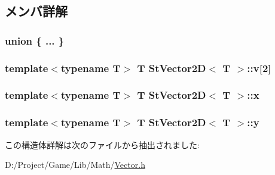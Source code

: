 \subsection{メンバ詳解}
\hypertarget{struct_st_vector2_d_ac356231747b1d0dceec316b255acb2a1}{}\subsubsection[{"@3}]{\setlength{\rightskip}{0pt plus 5cm}union \{ ... \} }\label{struct_st_vector2_d_ac356231747b1d0dceec316b255acb2a1}
\hypertarget{struct_st_vector2_d_ad3632da65fdf11cf3454dea5be131d6f}{}
\subsubsection[{v}]{\setlength{\rightskip}{0pt plus 5cm}template$<$typename T$>$ T {\bf St\+Vector2\+D}$<$ T $>$\+::v\mbox{[}2\mbox{]}}\label{struct_st_vector2_d_ad3632da65fdf11cf3454dea5be131d6f}
\hypertarget{struct_st_vector2_d_ac71ca17e2414184366465c9ef1c4c17c}{}
\subsubsection[{x}]{\setlength{\rightskip}{0pt plus 5cm}template$<$typename T$>$ T {\bf St\+Vector2\+D}$<$ T $>$\+::x}\label{struct_st_vector2_d_ac71ca17e2414184366465c9ef1c4c17c}
\hypertarget{struct_st_vector2_d_afd90945d8938a765fef59b70d2431fd6}{}
\subsubsection[{y}]{\setlength{\rightskip}{0pt plus 5cm}template$<$typename T$>$ T {\bf St\+Vector2\+D}$<$ T $>$\+::y}\label{struct_st_vector2_d_afd90945d8938a765fef59b70d2431fd6}


この構造体詳解は次のファイルから抽出されました\+:\begin{DoxyCompactItemize}
\item 
D\+:/\+Project/\+Game/\+Lib/\+Math/\hyperlink{_vector_8h}{Vector.\+h}\end{DoxyCompactItemize}
